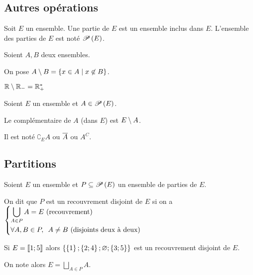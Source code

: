 \subsection{Autres opérations}

\begin{defi}
Soit \(E\) un ensemble. Une partie de \(E\) est un ensemble inclus dans \(E\). L'ensemble des parties de \(E\) est noté \(\P{E}\).
\end{defi}

\begin{defi}
Soient \(A,B\) deux ensembles.

On pose \(A\excluant B=\accol{x\in A\tq x\not\in B}\).
\end{defi}

\begin{ex}
\(\R\excluant\Rm=\Rps\)
\end{ex}

\begin{defi}[Complémentaire]
Soient \(E\) un ensemble et \(A\in\P{E}\).

Le complémentaire de \(A\) (dans \(E\)) est \(E\excluant A\).

Il est noté \(\complement_E A\) ou \(\conj{A}\) ou \(A^C\).
\end{defi}

\subsection{Partitions}

\begin{defi}
Soient \(E\) un ensemble et \(P\subset\P{E}\) un ensemble de parties de \(E\).

On dit que \(P\) est un recouvrement disjoint de \(E\) si on a \(\begin{dcases}\bigunion_{A\in P}A=E\text{ (recouvrement)} \\ \quantifs{\forall A,B\in P}A\not=B\text{ (disjoints deux à deux)}\end{dcases}\)
\end{defi}

\begin{ex}
Si \(E=\interventierii{1}{5}\) alors \(\accol{\accol{1};\accol{2;4};\ensvide;\accol{3;5}}\) est un recouvrement disjoint de \(E\).
\end{ex}

\begin{rem}
On note alors \(E=\bigsqcup_{A\in P}A\).
\end{rem}

